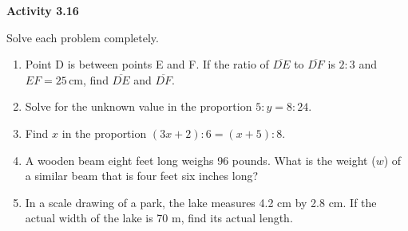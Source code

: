 \vspace{0.3ex}
\noindent\textbf{Activity 3.16}

\vspace{0.2ex}

Solve each problem completely.

\begin{enumerate}[noitemsep, label = \color{blue}\arabic*. ]
\item Point D is between points E and F. If the ratio of \(\overline{DE}\) to \(\overline{DF}\) is \(2:3\) and \(EF = 25 \, \text{cm}\), find \(\overline{DE}\) and \(\overline{DF}\).
\item Solve for the unknown value in the proportion \(5 : y = 8 : 24\).
\item Find \(x\) in the proportion \((3x + 2) : 6 = (x + 5) : 8\).
\item A wooden beam eight feet long weighs 96 pounds. What is the weight (\(w\)) of a similar beam that is four feet six inches long?
\item In a scale drawing of a park, the lake measures 4.2 cm by 2.8 cm. If the actual width of the lake is 70 m, find its actual length.
\end{enumerate}

